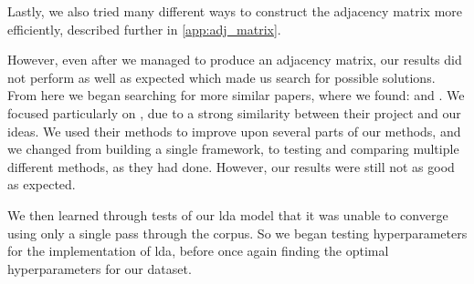 Lastly, we also tried many different ways to construct the adjacency matrix more efficiently, described further in \autoref{app:adj_matrix}.

However, even after we managed to produce an adjacency matrix, our results did not perform as well as expected which made us search for possible solutions.
From here we began searching for more similar papers, where we found: \citet{yang2009topic} and \citet{Tang2008}.
We focused particularly on \cite{yang2009topic}, due to a strong similarity between their project and our ideas.
We used their methods to improve upon several parts of our methods, and we changed from building a single framework, to testing and comparing multiple different methods, as they had done.
However, our results were still not as good as expected.

We then learned through tests of our \gls{lda} model that it was unable to converge using only a single pass through the corpus.
So we began testing hyperparameters for the implementation of \gls{lda}, before once again finding the optimal hyperparameters for our dataset.
